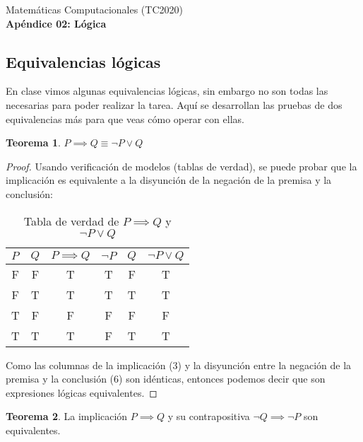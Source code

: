 \documentclass[]{book}
\theoremstyle{definition}
\newtheorem{thm}{Teorema}
\begin{document}
\begin{center}
{\huge Matemáticas Computacionales (TC2020)}\\[1.5ex]
{\large \textbf{Apéndice 02: Lógica}} %
\end{center}

\vspace{0.2 cm}

\subsection*{Equivalencias lógicas}

En clase vimos algunas equivalencias lógicas, sin embargo no son todas las necesarias para poder realizar la tarea.
Aquí se desarrollan las pruebas de dos equivalencias más para que veas cómo operar con ellas.

\vspace{0.5in}

\begin{thm}
    $P \implies Q \equiv \neg P \vee Q$
\end{thm}

\begin{proof}
    Usando verificación de modelos (tablas de verdad), se puede probar que la implicación es equivalente a la disyunción de la negación de la premisa y la conclusión:

    \begin{table}[htbp]
        \centering
        \caption{Tabla de verdad de $P \implies Q$ y $\neg P \vee Q$}
        \label{tab:implies}
        \begin{tabular}{@{}cccccc@{}}
        \toprule
        \multicolumn{1}{l}{$P$} & \multicolumn{1}{l}{$Q$} & \multicolumn{1}{l}{$P \implies Q$} & \multicolumn{1}{l}{$\neg P$} & \multicolumn{1}{l}{$Q$} & \multicolumn{1}{l}{$\neg P \vee Q$} \\ \midrule
        F & F & T & T & F & T \\
        F & T & T & T & T & T \\
        T & F & F & F & F & F \\
        T & T & T & F & T & T \\ \bottomrule
        \end{tabular}
    \end{table}

Como las columnas de la implicación (3) y la disyunción entre la negación de la premisa y la conclusión (6) son idénticas, entonces podemos decir que son expresiones lógicas equivalentes.
\end{proof}
\vspace{0.5in}
\begin{thm}
    La implicación $P \implies Q$ y su contrapositiva $\neg Q \implies \neg P$ son equivalentes.
\end{thm}
\end{document}
